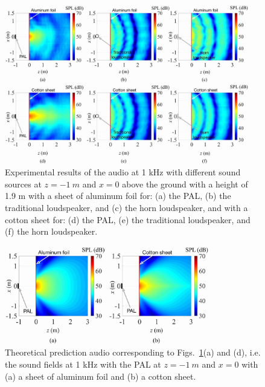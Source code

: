 \begin{figure}[!htb]
    \centering
    \includegraphics[width = 0.95\textwidth]{Figures/pending/AllExperimentalResults2_resize.jpg}
    \caption{Experimental results of the audio  at 1 kHz with different sound sources at $z = \SI{-1 }{m}$ and $x = 0$ above the ground with a height of 1.9 m with a sheet of aluminum foil for: (a) the PAL, (b) the traditional loudspeaker, and (c) the horn loudspeaker, and with a cotton sheet for: (d) the PAL, (e) the traditional loudspeaker, and (f) the horn loudspeaker.}
    \label{fig:partition_exp_results_all}
\end{figure}

\begin{figure}[!htb]
    \centering
    \includegraphics[width = 0.8\textwidth]{Figures/pending/Simulations_for_exp_horizontal_resize.jpg}
    \caption{Theoretical prediction audio  corresponding to Figs.~\ref{fig:partition_exp_results_all}(a) and (d), i.e. the sound fields at 1 kHz with the PAL at $z = \SI{-1 }{m}$ and $x = 0$ with (a) a sheet of aluminum foil and (b) a cotton sheet.}
    \label{fig:partition_exp_results_sim}
\end{figure}

